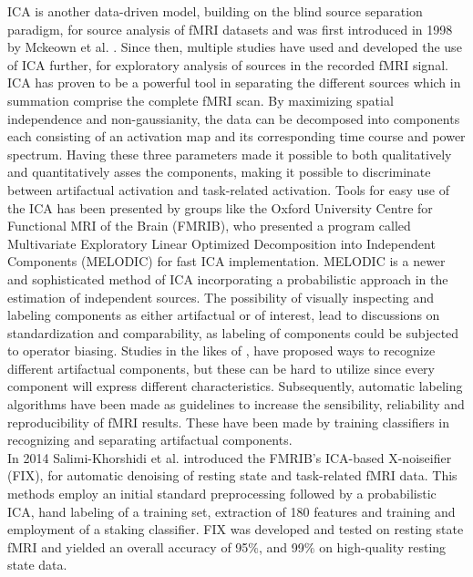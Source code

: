 ICA is another data-driven model, building on the blind source separation paradigm, for source analysis of fMRI datasets and was first introduced in 1998 by Mckeown et al. \cite{Mckeown1998}. Since then, multiple studies \cite{Calhoun2001a,Deslauriers2017,Parkes2018,Du2018,Tohka2008} have used and developed the use of ICA further, for exploratory analysis of sources in the recorded fMRI signal. ICA has proven to be a powerful tool in separating the different sources which in summation comprise the complete fMRI scan. By maximizing spatial independence and non-gaussianity, the data can be decomposed into components each consisting of an activation map and its corresponding time course and power spectrum. \cite{Salimi-Khorshidi2014} Having these three parameters made it possible to both qualitatively and quantitatively asses the components, making it possible to discriminate between artifactual activation and task-related activation. Tools for easy use of the ICA has been presented by groups like the Oxford University Centre for Functional MRI of the Brain (FMRIB), who presented a program called Multivariate Exploratory Linear Optimized Decomposition into Independent Components (MELODIC) for fast ICA implementation. MELODIC is a newer and sophisticated method of ICA incorporating a probabilistic approach in the estimation of independent sources. \cite{FMRIB2016} The possibility of visually inspecting and labeling components as either artifactual or of interest, lead to discussions on standardization and comparability, as labeling of components could be subjected to operator biasing. Studies in the likes of \cite{Salimi-Khorshidi2014,Griffanti2017}, have proposed ways to recognize different artifactual components, but these can be hard to utilize since every component will express different characteristics. Subsequently, automatic labeling algorithms have been made as guidelines to increase the sensibility, reliability and reproducibility of fMRI results. These have been made by training classifiers in recognizing and separating artifactual components. \cite{Tohka2008} \\
In 2014 Salimi-Khorshidi et al. \cite{Salimi-Khorshidi2014} introduced the FMRIB's ICA-based X-noiseifier (FIX), for automatic denoising of resting state and task-related fMRI data. This methods employ an initial standard preprocessing followed by a probabilistic ICA, hand labeling of a training set, extraction of 180 features and training and employment of a staking classifier. FIX was developed and tested on resting state fMRI and yielded an overall accuracy of 95$\percent$, and 99$\percent$ on high-quality resting state data. \cite{Salimi-Khorshidi2014}   \\
